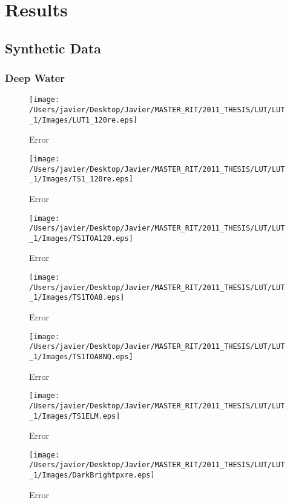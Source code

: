 \chapter{Results}
\section{Synthetic Data}
\subsection{Deep Water}

  \begin{figure}[H]
	\centering
    	\texttt{[image: /Users/javier/Desktop/Javier/MASTER\_RIT/2011\_THESIS/LUT/LUT\_1/Images/LUT1\_120re.eps]}
 	\caption{Error  \label{fig:errorLUT1}}
  \end{figure}

  \begin{figure}[H]
	\centering
    	\texttt{[image: /Users/javier/Desktop/Javier/MASTER\_RIT/2011\_THESIS/LUT/LUT\_1/Images/TS1\_120re.eps]}
 	\caption{Error  \label{fig:errorLUT1}}
  \end{figure}
  
    \begin{figure}[H]
	\centering
    	\texttt{[image: /Users/javier/Desktop/Javier/MASTER\_RIT/2011\_THESIS/LUT/LUT\_1/Images/TS1TOA120.eps]}
 	\caption{Error  \label{fig:errorLUT1}}
  \end{figure}
  
      \begin{figure}[H]
	\centering
    	\texttt{[image: /Users/javier/Desktop/Javier/MASTER\_RIT/2011\_THESIS/LUT/LUT\_1/Images/TS1TOA8.eps]}
 	\caption{Error  \label{fig:errorLUT1}}
  \end{figure}
  
        \begin{figure}[H]
	\centering
    	\texttt{[image: /Users/javier/Desktop/Javier/MASTER\_RIT/2011\_THESIS/LUT/LUT\_1/Images/TS1TOA8NQ.eps]}
 	\caption{Error  \label{fig:errorLUT1}}
  \end{figure}
  
          \begin{figure}[H]
	\centering
    	\texttt{[image: /Users/javier/Desktop/Javier/MASTER\_RIT/2011\_THESIS/LUT/LUT\_1/Images/TS1ELM.eps]}
 	\caption{Error  \label{fig:errorLUT1}}
  \end{figure}
  
          \begin{figure}[H]
	\centering
    	\texttt{[image: /Users/javier/Desktop/Javier/MASTER\_RIT/2011\_THESIS/LUT/LUT\_1/Images/DarkBrightpxre.eps]}
 	\caption{Error  \label{fig:errorLUT1}}
  \end{figure}
  
